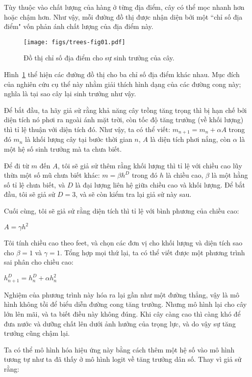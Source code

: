 \documentclass[12pt]{book}
\theoremstyle{exercise}
\begin{document}
Tùy thuộc vào chất lượng của hàng ở từng địa điểm, cây có thể mọc nhanh hơn hoặc chậm hơn. Như vậy, mỗi đường đồ thị được nhận diện bởi một ``chỉ số địa điểm" vốn phản ánh chất lượng của địa điểm này.

\begin{figure}
\centerline{\texttt{[image: figs/trees-fig01.pdf]}}
\caption{Đồ thị chỉ số địa điểm cho sự sinh trưởng của cây.}
\label{trees-fig01}
\end{figure}

Hình~\ref{trees-fig01} thể hiện các đường đồ thị cho ba chỉ số địa điểm khác nhau. Mục đích của nghiên cứu cụ thể này nhằm giải thích hình dạng của các đường cong này; nghĩa là tại sao cây lại sinh trưởng như vậy.

Để bắt đầu, ta hãy giả sử rằng khả năng cây trồng tăng trọng thì bị hạn chế bởi diện tích nó phơi ra ngoài ánh mặt trời, còn tốc độ tăng trưởng (về khối lượng) thì tỉ lệ thuận với diện tích đó. Như vậy, ta có thể viết:
%
$ m_{n+1} = m_n + \alpha A$
%
trong đó $m_n$ là khối lượng cây tại bước thời gian $n$, $A$ là diện tích phơi nắng, còn $\alpha$ là một hệ số sinh trưởng mà ta chưa biết.

Để đi từ $m$ đến $A$, tôi sẽ giả sử thêm rằng khối lượng thì tỉ lệ với chiều cao lũy thừa một số mũ chưa biết khác:
%
$ m = \beta h^D $
%
trong đó $h$ là chiều cao, $\beta$ là một hằng số tỉ lệ chưa biết, và $D$ là đại lượng liên hệ giữa chiều cao và khối lượng. Để bắt đầu, tôi sẽ giả sử $D=3$, và sẽ còn kiểm tra lại giả sử này sau.

Cuối cùng, tôi sẽ giả sử rằng diện tích thì tỉ lệ với bình phương của chiều cao:

$ A = \gamma h^2$

Tôi tính chiều cao theo feet, và chọn các đơn vị cho khối lượng và diện tích sao cho $\beta=1$ và $\gamma=1$. Tổng hợp mọi thứ lại, ta có thể viết được một phương trình sai phân cho chiều cao:

$ h_{n+1}^D = h_n^D + \alpha h_n^2 $

Nghiệm của phương trình này hóa ra lại gần như một đường thẳng, vậy là mô hình không tồi để biểu diễn đường cong tăng trưởng. Nhưng mô hình lại cho cây lớn lên mãi, và ta biết điều này không đúng. Khi cây càng cao thì càng khó để đưa nước và dưỡng chất lên dưới ảnh hưởng của trọng lực, và do vậy sự tăng trưởng cũng chậm lại.

Ta có thể mô hình hóa hiệu ứng này bằng cách thêm một hệ số vào mô hình tương tự như ta đã thấy ở mô hình logit về tăng trưởng dân số. Thay vì giả sử rằng:
\end{document}

